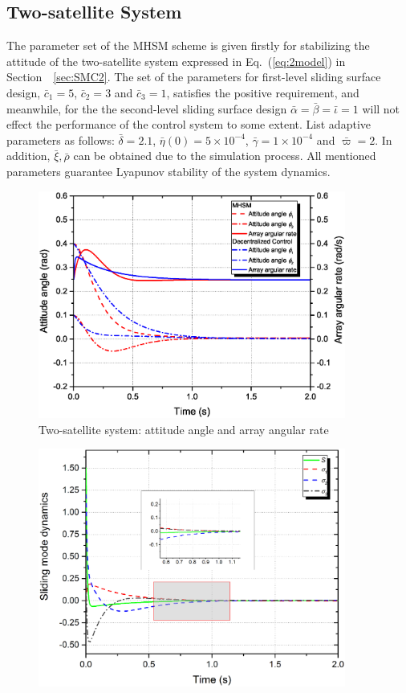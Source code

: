 \subsection{Two-satellite System}
The parameter set of the MHSM scheme is given firstly for stabilizing the attitude of the two-satellite system expressed in Eq.~(\ref{eq:2model}) in Section~~\ref{sec:SMC2}. The set of the parameters for first-level sliding surface design, $\bar c_1 = 5$, $\bar c_2 =3$ and $\bar c_3=1$, satisfies the positive requirement, and meanwhile, for the the second-level sliding surface design $\bar\alpha$$=\bar\beta=\bar\iota=1$ will not effect the performance of the control system to some extent. List adaptive parameters as follows: $\bar\delta = 2.1$, $\bar\eta(0)=5\times 10^{-4}$, $\bar\gamma = 1\times 10^{-4}$ and $\bar\varpi = 2$. In addition, $\bar\xi,\bar\rho$ can be obtained due to the simulation process. All mentioned parameters guarantee Lyapunov stability of the system dynamics.\par
\begin{figure}
\centering
\includegraphics[width=0.9\textwidth]{paper2_Fig8.eps}
\caption{Two-satellite system: attitude angle and array angular rate}
\label{Figure:2attitude}
\end{figure}
\begin{figure}
\centering
\includegraphics[width=0.9\textwidth]{paper2_Fig9.eps}

\end{figure}$$
